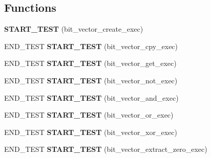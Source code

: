 \subsection*{Functions}
\begin{DoxyCompactItemize}
\item 
\mbox{\label{unit-test-bit-vector_8c_adcc0ff11db85b44020c86bf1a4183c29}} 
{\bfseries S\+T\+A\+R\+T\+\_\+\+T\+E\+ST} (bit\+\_\+vector\+\_\+create\+\_\+exec)
\item 
\mbox{\label{unit-test-bit-vector_8c_a2ae482ad8264f4a266053e127f5c22ad}} 
E\+N\+D\+\_\+\+T\+E\+ST {\bfseries S\+T\+A\+R\+T\+\_\+\+T\+E\+ST} (bit\+\_\+vector\+\_\+cpy\+\_\+exec)
\item 
\mbox{\label{unit-test-bit-vector_8c_a840046f31bbe711a37a38a0b213073c5}} 
E\+N\+D\+\_\+\+T\+E\+ST {\bfseries S\+T\+A\+R\+T\+\_\+\+T\+E\+ST} (bit\+\_\+vector\+\_\+get\+\_\+exec)
\item 
\mbox{\label{unit-test-bit-vector_8c_a07987551ba9c6926f067827e5d4b6559}} 
E\+N\+D\+\_\+\+T\+E\+ST {\bfseries S\+T\+A\+R\+T\+\_\+\+T\+E\+ST} (bit\+\_\+vector\+\_\+not\+\_\+exec)
\item 
\mbox{\label{unit-test-bit-vector_8c_a70e119864aed81cf0208d4ed6a402742}} 
E\+N\+D\+\_\+\+T\+E\+ST {\bfseries S\+T\+A\+R\+T\+\_\+\+T\+E\+ST} (bit\+\_\+vector\+\_\+and\+\_\+exec)
\item 
\mbox{\label{unit-test-bit-vector_8c_ab4bd518f0ef857e851fdd040def3a606}} 
E\+N\+D\+\_\+\+T\+E\+ST {\bfseries S\+T\+A\+R\+T\+\_\+\+T\+E\+ST} (bit\+\_\+vector\+\_\+or\+\_\+exec)
\item 
\mbox{\label{unit-test-bit-vector_8c_affbda332ea234ea83b975afe8941579b}} 
E\+N\+D\+\_\+\+T\+E\+ST {\bfseries S\+T\+A\+R\+T\+\_\+\+T\+E\+ST} (bit\+\_\+vector\+\_\+xor\+\_\+exec)
\item 
\mbox{\label{unit-test-bit-vector_8c_aa0e9723fed09cb66ffd1cda87d45516e}} 
E\+N\+D\+\_\+\+T\+E\+ST {\bfseries S\+T\+A\+R\+T\+\_\+\+T\+E\+ST} (bit\+\_\+vector\+\_\+extract\+\_\+zero\+\_\+exec)

\end{DoxyCompactItemize}
